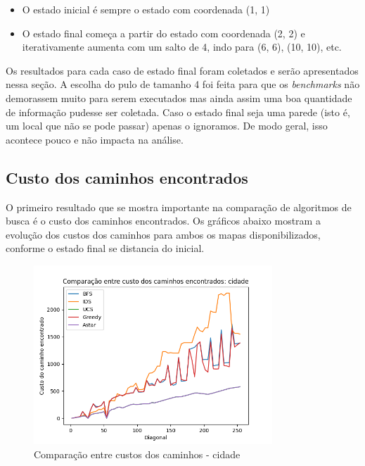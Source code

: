 \documentclass{article}
\begin{document}
\begin{itemize}
	\item O estado inicial é sempre o estado com coordenada (1, 1)
	\item O estado final começa a partir do estado com coordenada (2, 2) e iterativamente aumenta com um salto de 4, indo para
	      (6, 6), (10, 10), etc.
\end{itemize}

Os resultados para cada caso de estado final foram coletados e serão apresentados nessa seção. A escolha do pulo de tamanho 4 foi feita para que os \textit{benchmarks} não demorassem muito para serem executados mas ainda assim
uma boa quantidade de informação pudesse ser coletada. Caso o estado final seja uma parede (isto é, um local que não se pode passar) apenas o ignoramos. De modo geral, isso acontece pouco e não impacta na análise.


\subsection{Custo dos caminhos encontrados}

O primeiro resultado que se mostra importante na comparação de algoritmos de busca é o custo dos caminhos encontrados. Os gráficos abaixo mostram a evolução dos custos dos caminhos para ambos os mapas disponibilizados,
conforme o estado final se distancia do inicial.

\begin{figure}[H]
	\centering
	\includegraphics[width=0.8\textwidth]{../images/cidade_cost_benchmark.png}
	\caption{Comparação entre custos dos caminhos - cidade}
\end{figure}
\end{document}
